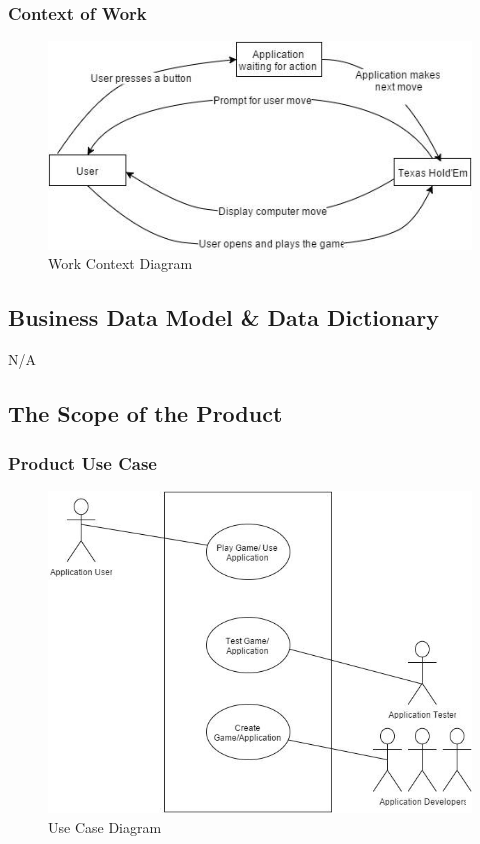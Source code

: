 \documentclass[12pt]{article}
\begin{document}
	\subsubsection{Context of Work}
		\begin{figure}[H]
		\includegraphics[scale=0.7]{ContexOfWork.jpg}
		\caption{Work Context Diagram}
		\label{fig1: Figure1}
		\end{figure}
	\subsection{Business Data Model \& Data Dictionary}
	N/A
	\subsection{The Scope of the Product}
	\subsubsection{Product Use Case}
		\begin{figure}[H]				
			\includegraphics[scale=0.5]{UseCase.jpg}		
			\caption{Use Case Diagram}		
			\label{fig2: Figure2}		
			\end{figure}
\end{document}
